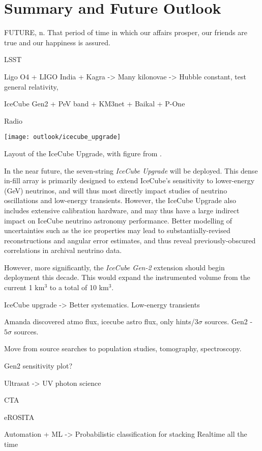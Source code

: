 \setchapterpreamble[u]{\margintoc}
\chapter{Summary and Future Outlook}
\begin{fquote} FUTURE, n. That period of time in which our affairs prosper, our friends are true and our happiness is assured.  
\end{fquote}

LSST

Ligo O4 + LIGO India + Kagra -> Many kilonovae -> Hubble constant, test general relativity, 

IceCube Gen2 + PeV band + KM3net + Baikal + P-One

Radio


\begin{marginfigure}
	\centering \texttt{[image: outlook/icecube\_upgrade]}
	\caption{Layout of the IceCube Upgrade, with figure from \cite{ic_upgrade}.}
	\label{fig:upgrade}
\end{marginfigure}

In the near future, the seven-string \emph{IceCube Upgrade} will be deployed. This dense in-fill array is primarily designed to extend IceCube's sensitivity to lower-energy (GeV) neutrinos, and will thus most directly impact studies of neutrino oscillations and low-energy transients. However, the IceCube Upgrade also includes extensive calibration hardware, and may thus have a large indirect impact on IceCube neutrino astronomy performance. Better modelling of uncertainties such as the ice properties may lead to substantially-revised reconstructions and angular error estimates, and thus reveal previously-obscured correlations in archival neutrino data.

However, more significantly, the \emph{IceCube Gen-2} extension should begin deployment this decade. This would expand the instrumented volume from the current 1 km$^{3}$ to a total of 10 km$^{3}$. 

IceCube upgrade -> Better systematics. Low-energy transients

Amanda discovered atmo flux, icecube astro flux, only hints/3$\sigma$ sources. Gen2 - $5\sigma$ sources.

Move from source searches to population studies, tomography, spectroscopy.

Gen2 sensitivity plot?

Ultrasat -> UV photon science

CTA

eROSITA

Automation + ML -> Probabilistic classification for stacking
Realtime all the time